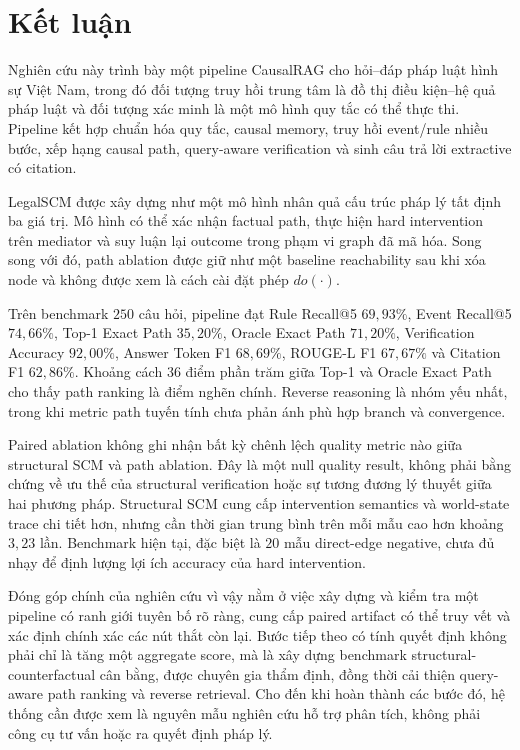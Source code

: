 \section{Kết luận}
\label{sec:conclusion}

Nghiên cứu này trình bày một pipeline CausalRAG cho hỏi--đáp pháp luật hình
sự Việt Nam, trong đó đối tượng truy hồi trung tâm là đồ thị điều kiện--hệ
quả pháp luật và đối tượng xác minh là một mô hình quy tắc có thể thực thi.
Pipeline kết hợp chuẩn hóa quy tắc, causal memory, truy hồi event/rule nhiều
bước, xếp hạng causal path, query-aware verification và sinh câu trả lời
extractive có citation.

LegalSCM được xây dựng như một mô hình nhân quả cấu trúc pháp lý tất định ba
giá trị. Mô hình có thể xác nhận factual path, thực hiện hard intervention
trên mediator và suy luận lại outcome trong phạm vi graph đã mã hóa. Song
song với đó, path ablation được giữ như một baseline reachability sau khi
xóa node và không được xem là cách cài đặt phép $do(\cdot)$.

Trên benchmark $250$ câu hỏi, pipeline đạt Rule Recall@5 $69{,}93\%$, Event
Recall@5 $74{,}66\%$, Top-1 Exact Path $35{,}20\%$, Oracle Exact Path
$71{,}20\%$, Verification Accuracy $92{,}00\%$, Answer Token F1
$68{,}69\%$, ROUGE-L F1 $67{,}67\%$ và Citation F1 $62{,}86\%$. Khoảng
cách $36$ điểm phần trăm giữa Top-1 và Oracle Exact Path cho thấy path
ranking là điểm nghẽn chính. Reverse reasoning là nhóm yếu nhất, trong khi
metric path tuyến tính chưa phản ánh phù hợp branch và convergence.

Paired ablation không ghi nhận bất kỳ chênh lệch quality metric nào giữa
structural SCM và path ablation. Đây là một null quality result, không phải
bằng chứng về ưu thế của structural verification hoặc sự tương đương lý
thuyết giữa hai phương pháp. Structural SCM cung cấp intervention semantics
và world-state trace chi tiết hơn, nhưng cần thời gian trung bình trên mỗi
mẫu cao hơn khoảng $3{,}23$ lần. Benchmark hiện tại, đặc biệt là $20$ mẫu
direct-edge negative, chưa đủ nhạy để định lượng lợi ích accuracy của hard
intervention.

Đóng góp chính của nghiên cứu vì vậy nằm ở việc xây dựng và kiểm tra một
pipeline có ranh giới tuyên bố rõ ràng, cung cấp paired artifact có thể truy
vết và xác định chính xác các nút thắt còn lại. Bước tiếp theo có tính quyết
định không phải chỉ là tăng một aggregate score, mà là xây dựng benchmark
structural-counterfactual cân bằng, được chuyên gia thẩm định, đồng thời cải
thiện query-aware path ranking và reverse retrieval. Cho đến khi hoàn thành
các bước đó, hệ thống cần được xem là nguyên mẫu nghiên cứu hỗ trợ phân tích,
không phải công cụ tư vấn hoặc ra quyết định pháp lý.
